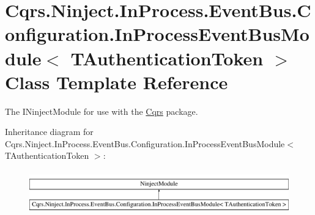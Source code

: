 \hypertarget{classCqrs_1_1Ninject_1_1InProcess_1_1EventBus_1_1Configuration_1_1InProcessEventBusModule}{}\section{Cqrs.\+Ninject.\+In\+Process.\+Event\+Bus.\+Configuration.\+In\+Process\+Event\+Bus\+Module$<$ T\+Authentication\+Token $>$ Class Template Reference}
\label{classCqrs_1_1Ninject_1_1InProcess_1_1EventBus_1_1Configuration_1_1InProcessEventBusModule}


The I\+Ninject\+Module for use with the \hyperlink{namespaceCqrs}{Cqrs} package.  


Inheritance diagram for Cqrs.\+Ninject.\+In\+Process.\+Event\+Bus.\+Configuration.\+In\+Process\+Event\+Bus\+Module$<$ T\+Authentication\+Token $>$\+:\begin{figure}[H]
\begin{center}
\leavevmode
\includegraphics[height=1.911263cm]{classCqrs_1_1Ninject_1_1InProcess_1_1EventBus_1_1Configuration_1_1InProcessEventBusModule}
\end{center}
\end{figure}
